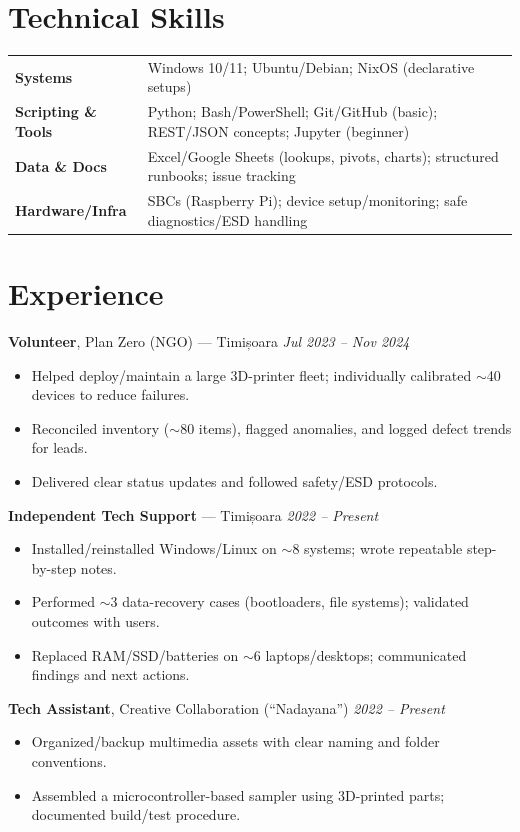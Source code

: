 \documentclass[10pt,a4paper]{article}
\begin{document}
\section*{Technical Skills}
\begin{tabularx}{\textwidth}{@{}p{3.1cm}Y@{}}
\textbf{Systems} & Windows 10/11; Ubuntu/Debian; NixOS (declarative setups) \\
\textbf{Scripting \& Tools} & Python; Bash/PowerShell; Git/GitHub (basic); REST/JSON concepts; Jupyter (beginner) \\
\textbf{Data \& Docs} & Excel/Google Sheets (lookups, pivots, charts); structured runbooks; issue tracking \\
\textbf{Hardware/Infra} & SBCs (Raspberry Pi); device setup/monitoring; safe diagnostics/ESD handling \\
\end{tabularx}

\section*{Experience}
\textbf{Volunteer}, Plan Zero (NGO) --- Timișoara \hfill \textit{Jul 2023 -- Nov 2024}\\
\begin{itemize}
  \item Helped deploy/maintain a large 3D-printer fleet; individually calibrated $\sim$40 devices to reduce failures.
  \item Reconciled inventory ($\sim$80 items), flagged anomalies, and logged defect trends for leads.
  \item Delivered clear status updates and followed safety/ESD protocols.
\end{itemize}

\textbf{Independent Tech Support} --- Timișoara \hfill \textit{2022 -- Present}\\
\begin{itemize}
  \item Installed/reinstalled Windows/Linux on $\sim$8 systems; wrote repeatable step-by-step notes.
  \item Performed $\sim$3 data-recovery cases (bootloaders, file systems); validated outcomes with users.
  \item Replaced RAM/SSD/batteries on $\sim$6 laptops/desktops; communicated findings and next actions.
\end{itemize}

\textbf{Tech Assistant}, Creative Collaboration (``Nadayana'') \hfill \textit{2022 -- Present}\\
\begin{itemize}
  \item Organized/backup multimedia assets with clear naming and folder conventions.
  \item Assembled a microcontroller-based sampler using 3D-printed parts; documented build/test procedure.
\end{itemize}
\end{document}
